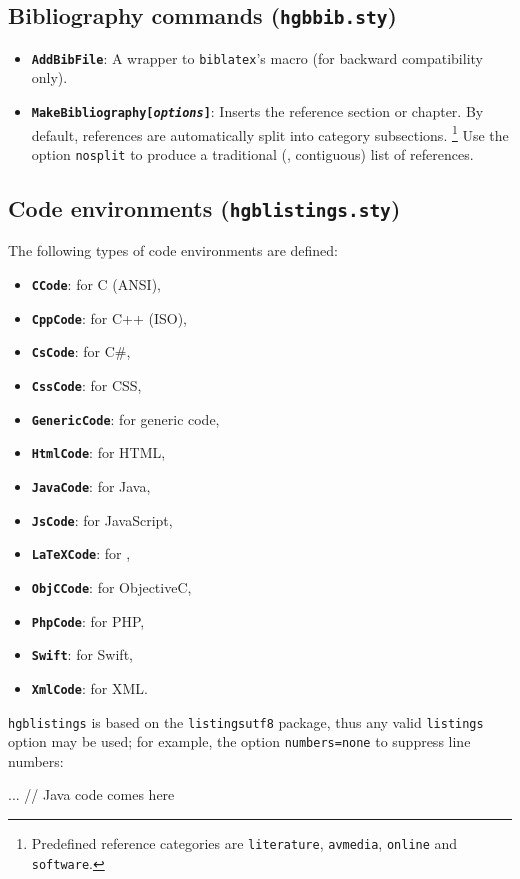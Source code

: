 \documentclass[english]{hgbarticle}
\begin{document}
\subsection{Bibliography commands (\texttt{hgbbib.sty})}



\begin{itemize}
\item \textbf{\texttt{{\bs}AddBibFile}}: A wrapper to \texttt{biblatex}'s \verb!! macro
(for backward compatibility only).
\item \textbf{\texttt{{\bs}MakeBibliography[\emph{options}]}}: Inserts the reference section or chapter.
By default, references are automatically split into category subsections.%
\footnote{Predefined reference categories are \texttt{literature}, \texttt{avmedia}, \texttt{online} and \texttt{software}.}
Use the option \texttt{nosplit} to produce a traditional (\ie, contiguous) list of references.
\end{itemize}



\subsection{Code environments (\texttt{hgblistings.sty})}

The following types of code environments are defined:%
%
\begin{itemize}
\item \textbf{\texttt{CCode}}: for C (ANSI),
\item \textbf{\texttt{CppCode}}: for C++ (ISO),
\item \textbf{\texttt{CsCode}}: for C\#,
\item \textbf{\texttt{CssCode}}: for CSS,
\item \textbf{\texttt{GenericCode}}: for generic code,
\item \textbf{\texttt{HtmlCode}}: for HTML,
\item \textbf{\texttt{JavaCode}}: for Java,
\item \textbf{\texttt{JsCode}}: for JavaScript,
\item \textbf{\texttt{LaTeXCode}}: for \latex,
\item \textbf{\texttt{ObjCCode}}: for ObjectiveC,
\item \textbf{\texttt{PhpCode}}: for PHP,
\item \textbf{\texttt{Swift}}: for Swift,
\item \textbf{\texttt{XmlCode}}: for XML.
\end{itemize}
%
\texttt{hgblistings} is based on the \texttt{listingsutf8} package,
thus any valid \texttt{listings} option may be used; for example, 
the option \texttt{numbers=none} to suppress line numbers:
\begin{LaTeXCode}[numbers=none]
    \begin{JavaCode}[numbers=none]
    ... // Java code comes here
    \end{JavaCode}
\end{LaTeXCode}
\end{document}
